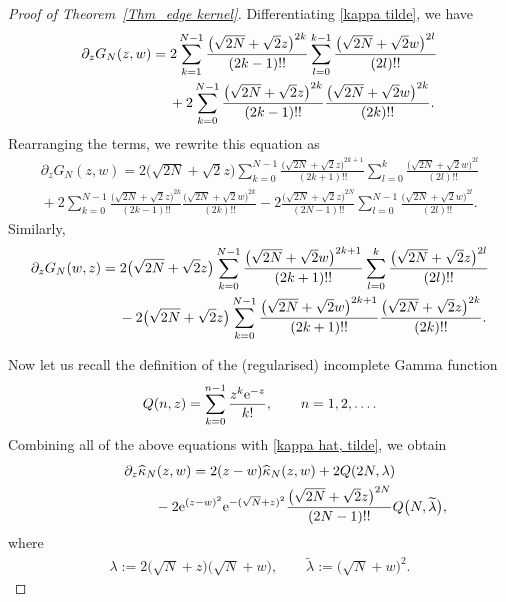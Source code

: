 \documentclass[pdftex]{sigma}
\numberwithin{equation}{section}
\newcommand{\1}{\chi}
\begin{document}
\begin{proof}[Proof of Theorem~\ref{Thm_edge kernel}]
	Differentiating \eqref{kappa tilde}, we have
	\begin{gather*}
		\partial_z G_N(z,w)= 2 \sum_{k=1}^{N-1} \frac{\big( \sqrt{2N}+ \sqrt{2}z \big)^{2k}}{(2k-1)!!} \sum_{l=0}^{k-1} \frac{\big( \sqrt{2N}+\sqrt{2} w\big)^{2l} }{(2l)!!}\\
\hphantom{\partial_z G_N(z,w)=}{}
+ 2 \sum_{k=0}^{N-1} \frac{\big( \sqrt{2N}+ \sqrt{2}z \big)^{2k}}{(2k-1)!!} \frac{\big( \sqrt{2N}+ \sqrt{2} w\big)^{2k} }{(2k)!!}.
	\end{gather*}
	Rearranging the terms, we rewrite this equation as
	\begin{gather*}
 \partial_z G_N(z,w)
		= 2 \big(\sqrt{2N}+\sqrt{2}z\big) \sum_{k=0}^{N-1} \frac{\big( \sqrt{2N}+ \sqrt{2}z \big)^{2k+1}}{(2k+1)!!} \sum_{l=0}^{k} \frac{\big( \sqrt{2N}+\sqrt{2} w\big)^{2l} }{(2l)!!}
		\\
{}+ 2 \sum_{k=0}^{N-1} \frac{\big( \sqrt{2N}+ \sqrt{2}z \big)^{2k}}{(2k-1)!!} \frac{\big( \sqrt{2N}+ \sqrt{2} w\big)^{2k} }{(2k)!!}
		-2 \frac{\big( \sqrt{2N}+ \sqrt{2}z \big)^{2N}}{(2N-1)!!} \sum_{l=0}^{N-1} \frac{\big( \sqrt{2N}+\sqrt{2} w\big)^{2l} }{(2l)!!}.
	\end{gather*}
	Similarly,
	\begin{gather*}
		\partial_z G_N(w,z)= 2 \big( \sqrt{2N}+\sqrt{2} z\big) \sum_{k=0}^{N-1} \frac{\big( \sqrt{2N}+\sqrt{2} w\big)^{2k+1}}{(2k+1)!!} \sum_{l=0}^{k} \frac{\big( \sqrt{2N}+\sqrt{2} z\big)^{2l} }{(2l)!!}
		\\
\hphantom{\partial_z G_N(w,z)=}{}
- 2 \big( \sqrt{2N}+\sqrt{2} z\big) \sum_{k=0}^{N-1} \frac{\big( \sqrt{2N}+\sqrt{2} w\big)^{2k+1}}{(2k+1)!!} \frac{\big( \sqrt{2N}+\sqrt{2} z\big)^{2k} }{(2k)!!}.
	\end{gather*}
	
Now let us recall the definition of the (regularised) incomplete Gamma function \cite[Chapter~8]{olver2010nist}
\begin{gather*}
Q(n,z)= \sum_{k=0}^{n-1} \frac{z^k {\rm e}^{-z}}{k!}, \qquad n=1,2,\dots.
\end{gather*}
	Combining all of the above equations with \eqref{kappa hat, tilde}, we obtain
\begin{gather}
\partial_z \widehat{\kappa}_N(z,w)= 2(z-w) \widehat{\kappa}_N(z,w) +2 Q(2N,\lambda)\nonumber\\
\hphantom{\partial_z \widehat{\kappa}_N(z,w)=}{}
-2 {\rm e}^{ (z-w)^2 } {\rm e}^{ -( \sqrt{N}+ z)^2 } \frac{\big( \sqrt{2N}+ \sqrt{2}z \big)^{2N}}{(2N-1)!!} Q\big(N,\widetilde{\lambda}\big),\label{kappa hat pde 1-0}
\end{gather}
	where
\begin{gather*}
		\lambda:=2\big( \sqrt{N}+ z \big) \big( \sqrt{N}+ w\big),\qquad \widetilde{\lambda}:=\big( \sqrt{N}+ w\big)^2.
\end{gather*}
	

\end{proof}
\end{document}
